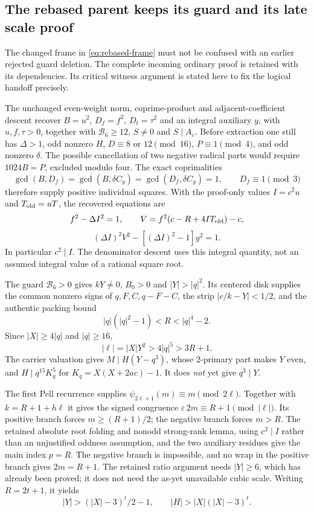 \subsection{The rebased parent keeps its guard and its late scale proof}
The changed frame in \eqref{eq:rebased-frame} must not be confused with
an earlier rejected guard deletion. The complete incoming ordinary proof
is retained with its dependencies. Its critical witness argument is stated
here to fix the logical handoff precisely.

The unchanged even-weight norm, coprime-product and adjacent-coefficient
descent recover $B=u^2$, $D_f=f^2$, $D_t=\tau^2$ and an integral
auxiliary $y$, with $u,f,\tau>0$, together with
$\mathcal B_6\ge12$, $S\ne0$ and $S\mid A_c$.
Before extraction one still has $\Delta>1$, odd nonzero $H$,
$D\equiv8$ or $12\pmod{16}$, $P\equiv1\pmod4$, and odd nonzero
$\delta$. The possible cancellation of two negative radical parts would
require $1024B=P$, excluded modulo four. The exact coprimalities
\[
 \gcd(B,D_f)=\gcd(B,\delta C_y)=\gcd(D_f,\delta C_y)=1,
 \qquad D_f\equiv1\pmod3
\]
therefore supply positive individual squares. With the proof-only values
$I=c^2u$ and $T_{\rm old}=uT$, the recovered equations are
\[
 f^2-\Delta I^2=1,\qquad
 V=f^2(c-R+4IT_{\rm old})-c,
\]
\[
 (\Delta I)^2V^2-[(\Delta I)^2-1]y^2=1.
\]
In particular $c^2\mid I$. The denominator descent uses this integral
quantity, not an assumed integral value of a rational square root.

The guard $\mathcal B_6>0$ gives $kY\ne0$, $B_0>0$ and
$|Y|>|q|^2$. Its centered disk supplies the common nonzero signs of
$q,F,C,q-F-C$, the strip $|c/k-Y|<1/2$, and the authentic packing bound
\[
 |q|(|q|^2-1)<R<|q|^4-2.
\]
Since $|X|\ge4|q|$ and $|q|\ge16$,
\[
 |\ell|=|X|Y^2>4|q|^5>3R+1.
\]
The carrier valuation gives $M\mid H(Y-q^3)$, whose 2-primary part
makes $Y$ even, and $H\mid q^{15}K_q^5$ for
$K_q=X(X+2ac)-1$. It does \emph{not} yet give $q^3\mid Y$.

The first Pell recurrence supplies
$\psi_{2\ell+1}(m)\equiv m\pmod{2\ell}$.
Together with $k=R+1+h\ell$ it gives the signed congruence
$\varepsilon\,2m\equiv R+1\pmod{|\ell|}$.
Its positive branch forces $m\ge(R+1)/2$; the negative branch forces
$m>R$. The retained absolute root folding and nonodd strong-rank lemma,
using $c^2\mid I$ rather than an unjustified oddness assumption, and
the two auxiliary residues give the main index $p=R$. The negative
branch is impossible, and no wrap in the positive branch gives
$2m=R+1$. The retained ratio argument needs $|Y|\ge6$, which has
already been proved; it does not need the as-yet unavailable cubic scale.
Writing $R=2t+1$, it yields
\[
 |Y|>(|X|-3)^t/2-1,
 \qquad |H|>|X|(|X|-3)^t.
\]

